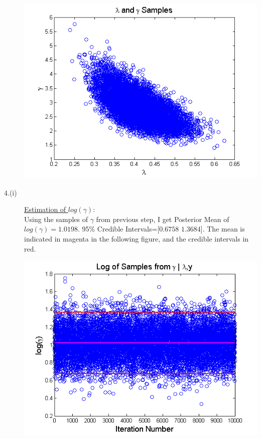\documentclass{article}
\begin{document}
\begin{description}
\begin{right}
\end{right}
\begin{center}
\includegraphics[scale=0.5]{GAndLJoint.png}\\
\end{center}

\pagebreak

\item[4.(i)] \underline{Estimation of $log(\gamma):$}\\
Using the samples of $\gamma$ from previous step, I get Posterior Mean of $log(\gamma)=1.0198.$ 95\% Credible Intervals=[$0.6758$ $1.3684$]. The mean is indicated in magenta in the following figure, and the credible intervals in red. \\
\begin{center}
\includegraphics[scale=0.5]{logGGivenLAndY.png}\\
\end{center}


\end{description}
\end{document}
